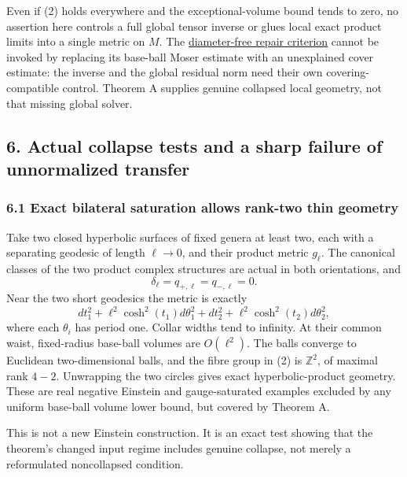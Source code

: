 \documentclass[
  11pt,
]{article}
\begin{document}
Even if (2) holds everywhere and the exceptional-volume bound tends to
zero, no assertion here controls a full global tensor inverse or glues
local exact product limits into a single metric on \(M\). The
\href{20260924_local_to_global_scope.md}{diameter-free repair criterion}
cannot be invoked by replacing its base-ball Moser estimate with an
unexplained cover estimate: the inverse and the global residual norm
need their own covering-compatible control. Theorem A supplies genuine
collapsed local geometry, not that missing global solver.

\hypertarget{actual-collapse-tests-and-a-sharp-failure-of-unnormalized-transfer}{%
\subsection{6. Actual collapse tests and a sharp failure of unnormalized
transfer}\label{actual-collapse-tests-and-a-sharp-failure-of-unnormalized-transfer}}

\hypertarget{exact-bilateral-saturation-allows-rank-two-thin-geometry}{%
\subsubsection{6.1 Exact bilateral saturation allows rank-two thin
geometry}\label{exact-bilateral-saturation-allows-rank-two-thin-geometry}}

Take two closed hyperbolic surfaces of fixed genera at least two, each
with a separating geodesic of length \(\ell\to0\), and their product
metric \(g_\ell\). The canonical classes of the two product complex
structures are actual in both orientations, and \[
                    \delta_\ell=q_{+,\ell}=q_{-,\ell}=0.
 \tag{13}
\] Near the two short geodesics the metric is exactly \[
 dt_1^2+\ell^2\cosh^2(t_1)d\theta_1^2
 +dt_2^2+\ell^2\cosh^2(t_2)d\theta_2^2,
 \tag{14}
\] where each \(\theta_i\) has period one. Collar widths tend to
infinity. At their common waist, fixed-radius base-ball volumes are
\(O(\ell^2)\). The balls converge to Euclidean two-dimensional balls,
and the fibre group in (2) is \(\mathbb Z^2\), of maximal rank \(4-2\).
Unwrapping the two circles gives exact hyperbolic-product geometry.
These are real negative Einstein and gauge-saturated examples excluded
by any uniform base-ball volume lower bound, but covered by Theorem A.

This is not a new Einstein construction. It is an exact test showing
that the theorem's changed input regime includes genuine collapse, not
merely a reformulated noncollapsed condition.
\end{document}
